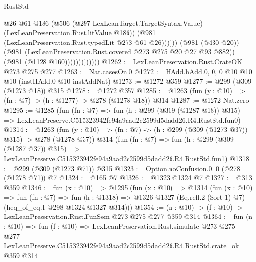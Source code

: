\begin{lexlean}{RustStd}
\begin{coremodule}
                                  @26
                                  @61
                                  @186
                                  (@506
                                    (@297 LexLeanTarget.TargetSyntax.Value)
                                    (LexLeanPreservation.Rust.litValue @186))
                                  (@981 (LexLeanPreservation.Rust.typedLit @273 @61 @26))))))
                          (@981 (@430 @20))
                          (@981 (LexLeanPreservation.Rust.covered @273 @275 @20 @27 @93 @882))
                          (@981 (@1128 @160)))))))))))))
@1262 := LexLeanPreservation.Rust.CrateOK @273 @275 @277
@1263 := Nat.casesOn.{0}
@1272 := HAdd.hAdd.{0, 0, 0} @10 @10 @10 (instHAdd.{0} @10 instAddNat)
@1273 := @1272 @359
@1277 := @299 (@309 (@1273 @18)) @315
@1278 := @1272 @357
@1285 := @1263 (fun (y : @10) => (fn : @7) -> (h : @1277) -> @278 (@1278 @18)) @314
@1287 := @1272 Nat.zero
@1295 := @1285
    (fun (fn : @7) =>
    fun (h : @299 (@309 (@1287 @18)) @315) =>
    LexLeanPreserve.C515323942fe94a9aad2c2599d5dadd26.R4.RustStd.fun0)
@1314 := @1263
    (fun (y : @10) => (fn : @7) -> (h : @299 (@309 (@1273 @37)) @315) -> @278 (@1278 @37))
    @314
    (fun (fn : @7) =>
    fun (h : @299 (@309 (@1287 @37)) @315) =>
    LexLeanPreserve.C515323942fe94a9aad2c2599d5dadd26.R4.RustStd.fun1)
@1318 := @299 (@309 (@1273 @71)) @315
@1323 := Option.noConfusion.{0, 0} (@278 (@1278 @71)) @7
@1324 := @165 @7
@1326 := @1323 @1324 @7
@1327 := @313 @359
@1346 := fun (x : @10) =>
  @1295
    (fun (x : @10) =>
    @1314
      (fun (x : @10) =>
      fun (fn : @7) =>
      fun (h : @1318) =>
      @1326 @1327 (Eq.refl.{2} (Sort 1) @7) (heq_of_eq.{1} @298 @1324 @1327 @314)))
@1354 := (n : @10) -> (f : @10) -> LexLeanPreservation.Rust.FunSem @273 @275 @277 @359 @314
@1364 := fun (n : @10) =>
  fun (f : @10) =>
  LexLeanPreservation.Rust.simulate
    @273
    @275
    @277
    LexLeanPreserve.C515323942fe94a9aad2c2599d5dadd26.R4.RustStd.crate_ok
    @359
    @314
\end{coremodule}
\end{lexlean}
